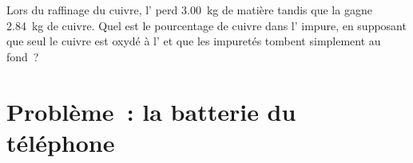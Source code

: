 \begin{exercise}[$\star\star\star$]\label{exo:g12:cells-and-electrolysis:15}
Lors du raffinage du cuivre, l' perd \qty{3.00}{kg} de matière
tandis que la  gagne \qty{2.84}{kg} de cuivre. Quel est le
pourcentage de cuivre dans l' impure, en supposant que seul le
cuivre est oxydé à l' et que les impuretés tombent simplement au
fond~?
\end{exercise}

\section{Problème~: la batterie du téléphone}

